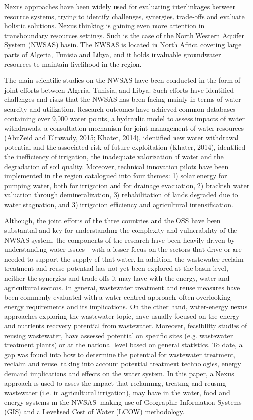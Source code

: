 Nexus approaches have been widely used for evaluating interlinkages between resource systems, trying to identify challenges, synergies, trade-offs and evaluate holistic solutions. Nexus thinking is gaining even more attention in transboundary resources settings. Such is the case of the North Western Aquifer System (NWSAS) basin. The NWSAS is located in North Africa covering large parts of Algeria, Tunisia and Libya, and it holds invaluable groundwater resources to maintain livelihood in the region.

The main scientific studies on the NWSAS have been conducted in the form of joint efforts between Algeria, Tunisia, and Libya. Such efforts have identified challenges and risks that the NWSAS has been facing mainly in terms of water scarcity and utilization. Research outcomes have achieved common databases containing over 9,000 water points, a hydraulic model to assess impacts of water withdrawals, a consultation mechanism for joint management of water resources (AbuZeid and Elrawady, 2015; Khater, 2014), identified new water withdrawal potential and the associated risk of future exploitation (Khater, 2014), identified the inefficiency of irrigation, the inadequate valorization of water and the degradation of soil quality. Moreover, technical innovation pilots have been implemented in the region catalogued into four themes: 1) solar energy for pumping water, both for irrigation and for drainage evacuation, 2) brackish water valuation through demineralization, 3) rehabilitation of lands degraded due to water stagnation, and 3) irrigation efficiency and agricultural intensification. 

Although, the joint efforts of the three countries and the OSS have been substantial and key for understanding the complexity and vulnerability of the NWSAS system, the components of the research have been heavily driven by understanding water issues---with a lesser focus on the sectors that drive or are needed to support the supply of that water. In addition, the wastewater reclaim treatment and reuse potential has not yet been explored at the basin level, neither the synergies and trade-offs it may have with the energy, water and agricultural sectors. In general, wastewater treatment and reuse measures have been commonly evaluated with a water centred approach, often overlooking energy requirements and its implications. On the other hand, water-energy nexus approaches exploring the wastewater topic, have usually focused on the energy and nutrients recovery potential from wastewater. Moreover, feasibility studies of reusing wastewater, have assessed potential on specific sites (e.g. wastewater treatment plants) or at the national level based on general statistics. To date, a gap was found into how to determine the potential for wastewater treatment, reclaim and reuse, taking into account potential treatment technologies, energy demand implications and effects on the water system. In this paper, a Nexus approach is used to asses the impact that reclaiming, treating and reusing wastewater (i.e. in agricultural irrigation), may have in the water, food and energy systems in the NWSAS, making use of Geographic Information Systems (GIS) and a Levelised Cost of Water (LCOW) methodology.

